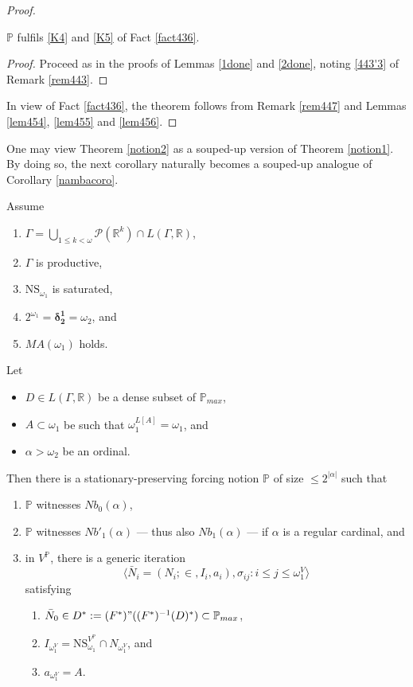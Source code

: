 \documentclass[12pt]{article}
\numberwithin{equation}{section}
\begin{document}
\begin{proof}
\begin{lem}\label{lem456}
$\mathbb{P}$ fulfils \ref{K4} and \ref{K5} of Fact \ref{fact436}.
\end{lem}

\begin{proof}
Proceed as in the proofs of Lemmas \ref{1done} and \ref{2done}, noting \ref{443'3} of Remark \ref{rem443}.
\end{proof}

In view of Fact \ref{fact436}, the theorem follows from Remark \ref{rem447} and Lemmas \ref{lem454}, \ref{lem455} and \ref{lem456}.
\end{proof}

One may view Theorem \ref{notion2} as a souped-up version of Theorem \ref{notion1}. By doing so, the next corollary naturally becomes a souped-up analogue of Corollary \ref{nambacoro}. 

\begin{cor}\label{nbcoro2}
Assume
\begin{enumerate}[label=(\roman*), leftmargin=40pt]
    \item $\Gamma  = \bigcup_{1 \leq k < \omega} \mathcal{P}(\mathbb{R}^{k}) \cap L(\Gamma, \mathbb{R})$,
    \item $\Gamma$ is productive,
    \item $\mathrm{NS}_{\omega_1}$ is saturated,
    \item $2^{\omega_1} = \mathbf{\delta^1_2} = \omega_2$, and
    \item $MA(\omega_1)$ holds.
\end{enumerate}
Let 
\begin{itemize}
    \item $D \in L(\Gamma, \mathbb{R})$ be a dense subset of $\mathbb{P}_{max}$,
    \item $A \subset \omega_1$ be such that $\omega_1^{L[A]} = \omega_1$, and
    \item $\alpha > \omega_2$ be an ordinal.
\end{itemize}
Then there is a stationary-preserving forcing notion $\mathbb{P}$ of size $\leq 2^{|\alpha|}$ such that
\begin{enumerate}[label=(\alph*)]
    \item $\mathbb{P}$ witnesses $Nb_0(\alpha)$,
    \item $\mathbb{P}$ witnesses $Nb'_1(\alpha)$ --- thus also $Nb_1(\alpha)$ --- if $\alpha$ is a regular cardinal, and
    \item in $V^{\mathbb{P}}$, there is a generic iteration $$\langle \bar{N}_i = (N_i; \in, I_i, a_i), \sigma_{ij} : i \leq j \leq \omega_1^V \rangle$$ satisfying 
    \begin{enumerate}[label=(\arabic*), leftmargin=40pt]
        \item $\bar{N}_0 \in D^* := (F^*) " ((F^*)^{-1}(D)^*) \subset \mathbb{P}_{max}$,
        \item $I_{\omega_1^V} = \mathrm{NS}_{\omega_1}^{V^{\mathbb{P}}} \cap N_{\omega_1^V}$, and
        \item $a_{\omega_1^V} = A$.
    \end{enumerate}
\end{enumerate}
\end{cor}
\end{document}
